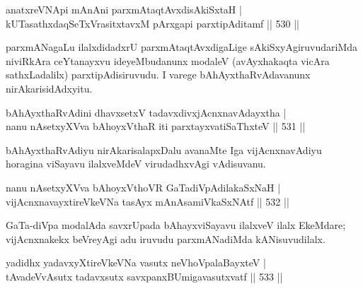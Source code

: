 \begin{shl}
anatxreVNApi mAnAni parxmAtaqtAvxdisAkiSxtaH | \\
kUTasathxdaqSeTxVrasitxtavxM pArxgapi parxtipAditamf \hfill||  530 ||  
\end{shl}

\begin{artha}
parxmANagaLu ilalxdidadxrU parxmAtaqtAvxdigaLige sAkiSxyAgiruvudariMda niviRkAra ceYtanayxvu ideyeMbudanunx modaleV (avAyxhakaqta vicAra sathxLadalilx) parxtipAdisiruvudu. I varege bAhAyxthaRvAdavanunx nirAkarisidAdxyitu.
\end{artha}


\begin{shl}
bAhAyxthaRvAdini dhavxsetxV tadavxdivxjAcnxnavAdayxtha | \\
nanu nAsetxyXVva bAhoyxV\s thaR iti parxtayxvatiSaThxteV \hfill||  531 ||  
\end{shl}

\begin{artha}
bAhAyxthaRvAdiyu nirAkarisalapxDalu avanaMte Iga vijAcnxnavAdiyu horagina viSayavu ilalxveMdeV virudadhxvAgi vAdisuvanu.
\end{artha}


\begin{shl}
nanu nAsetxyXVva bAhoyxV\s thoVR GaTadiVpAdilakaSxNaH | \\
vijAcnxnavayxtireVkeVNa tasAyx mAnAsamiVkaSxNAtf \hfill||  532 ||  
\end{shl}

\begin{artha}
GaTa-diVpa modalAda savxrUpada bAhayxviSayavu ilalxveV ilalx EkeMdare; vijAcnxnakekx beVreyAgi adu iruvudu parxmANadiMda kANisuvudilalx.
\end{artha}


\begin{shl}
\footnotemark[1]yadidhx yadavxyXtireVkeVNa vasutx neVhoVpalaBayxteV | \\
tAvadeVvAsutx tadavxsutx savxpanxBUmigavasutxvatf \hfill||  533 ||  
\end{shl}

